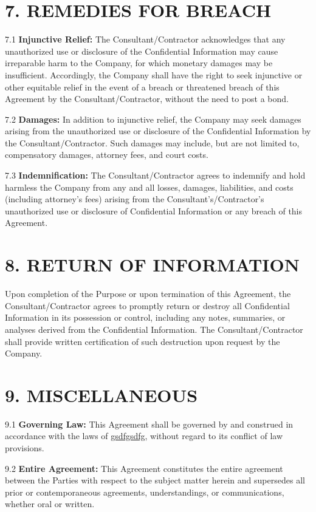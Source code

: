 \documentclass[12pt]{article}
\begin{document}
\section*{7. REMEDIES FOR BREACH}

7.1 \textbf{Injunctive Relief:} The Consultant/Contractor acknowledges that any unauthorized use or disclosure of the Confidential Information may cause irreparable harm to the Company, for which monetary damages may be insufficient. Accordingly, the Company shall have the right to seek injunctive or other equitable relief in the event of a breach or threatened breach of this Agreement by the Consultant/Contractor, without the need to post a bond.

7.2 \textbf{Damages:} In addition to injunctive relief, the Company may seek damages arising from the unauthorized use or disclosure of the Confidential Information by the Consultant/Contractor. Such damages may include, but are not limited to, compensatory damages, attorney fees, and court costs.

7.3 \textbf{Indemnification:} The Consultant/Contractor agrees to indemnify and hold harmless the Company from any and all losses, damages, liabilities, and costs (including attorney’s fees) arising from the Consultant’s/Contractor’s unauthorized use or disclosure of Confidential Information or any breach of this Agreement.

\section*{8. RETURN OF INFORMATION}

Upon completion of the Purpose or upon termination of this Agreement, the Consultant/Contractor agrees to promptly return or destroy all Confidential Information in its possession or control, including any notes, summaries, or analyses derived from the Confidential Information. The Consultant/Contractor shall provide written certification of such destruction upon request by the Company.

\section*{9. MISCELLANEOUS}

9.1 \textbf{Governing Law:} This Agreement shall be governed by and construed in accordance with the laws of \underline{gsdfgsdfg}, without regard to its conflict of law provisions.

9.2 \textbf{Entire Agreement:} This Agreement constitutes the entire agreement between the Parties with respect to the subject matter herein and supersedes all prior or contemporaneous agreements, understandings, or communications, whether oral or written.
\end{document}
